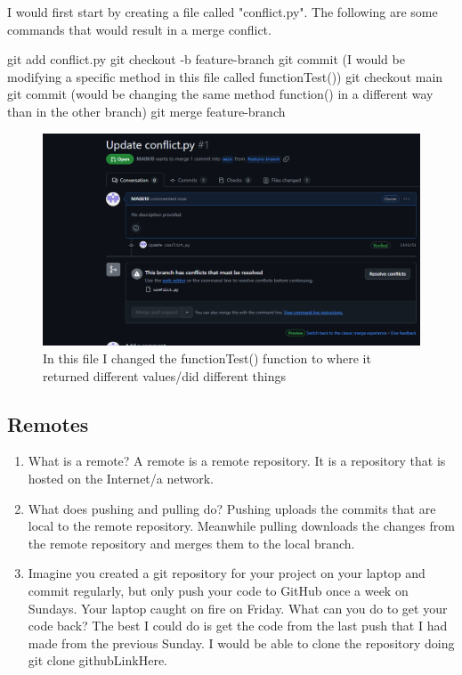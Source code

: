 \documentclass[10pt,twocolumn]{article}
\begin{document}
\begin{enumerate}
\subitem
I would first start by creating a file called "conflict.py". The following are some commands that would result in a merge conflict.

git add conflict.py
git checkout -b feature-branch
git commit (I would be modifying a specific method in this file called functionTest())
git checkout main
git commit (would be changing the same method function() in a different way than in the other branch)
git merge feature-branch

\begin{figure}[tbh]
\vspace{0.1cm}
    \centering
    \includegraphics[width=\columnwidth]{Screenshot 2025-03-03 211752.png}
    \caption{In this file I changed the functionTest() function to where it returned different values/did different things}
    \label{fig:alrc}
    \footnotesize
    \vspace{\baselineskip}
\end{figure}

\end{enumerate}

\subsection{Remotes}

\begin{enumerate}
\item What is a remote?
\subitem A remote is a remote repository. It is a repository that is hosted on the Internet/a network.

\item What does pushing and pulling do?
\subitem Pushing uploads the commits that are local to the remote repository. Meanwhile pulling downloads the changes from the remote repository and merges them to the local branch.

\item Imagine you created a git repository for your project on your laptop and commit regularly, but only push your code to GitHub once a week on Sundays. Your laptop caught on fire on Friday. What can you do to get your code back?
\subitem The best I could do is get the code from the last push that I had made from the previous Sunday. I would be able to clone the repository doing git clone githubLinkHere.

\end{enumerate}
\end{document}
